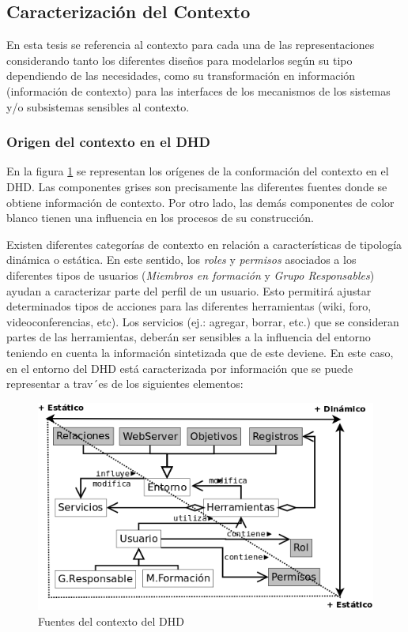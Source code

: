\subsection {Caracterización del Contexto}

En esta tesis se referencia al contexto para cada una de las representaciones considerando tanto los diferentes diseños para modelarlos según su tipo dependiendo de las necesidades, como su transformación en información (información de contexto)  para las interfaces de los mecanismos de los sistemas y/o subsistemas sensibles al contexto.

\subsubsection{Origen del contexto en el DHD}

En la figura \ref{fig:ontologiaContexto} se representan los orígenes de la conformación del contexto en el DHD. Las componentes grises son precisamente las diferentes fuentes donde se obtiene información de contexto. Por otro lado, las demás componentes de color blanco tienen una influencia en los procesos de su construcción. 

Existen diferentes categorías de contexto en relación a características de tipología dinámica o estática. En este sentido, los \textit{roles} y \textit{permisos} asociados a los diferentes tipos de usuarios (\textit{Miembros en formación} y \textit{Grupo Responsables}) ayudan a
caracterizar parte del perfil de un usuario. Esto permitirá ajustar determinados tipos de acciones para las diferentes herramientas (wiki, foro, videoconferencias, etc). Los servicios (ej.: agregar, borrar, etc.) que se consideran partes de las herramientas, deberán ser sensibles a la influencia del entorno teniendo en cuenta la información sintetizada que de este deviene. En este caso, en el entorno del DHD está caracterizada por información que se puede representar a trav´es de los siguientes elementos: 


\begin{figure} 
\begin{center}
 \includegraphics [width=5 in,totalheight=3 in] {Ch1/Figuras/contexto.png}
\caption {Fuentes del contexto del DHD}
\label{fig:ontologiaContexto}
\end{center}
\end{figure}



